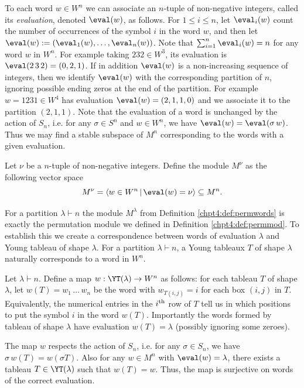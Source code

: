 \documentclass[11pt]{report}
\begin{document}
To each word $w \in W^n$ we can associate an $n$-tuple of non-negative 
integers, called its \emph{evaluation}, denoted $\eval(w)$, as follows. For $1\leq i 
\leq n$, let $\eval_i(w)$ count the number of occurrences of the symbol $i$ 
in the word $w$, and then let $\eval(w):= (\eval_1(w),\ldots,\eval_n(w))$.
Note that $\sum_{i=1}^n \eval_i(w) = n$ for any word $w$ in $W^n$.
For example taking $232 \in W^{3}$, its evaluation is 
$\eval(2\,3\,2) = (0,2,1)$. If in addition $\eval(w)$ is a 
non-increasing sequence of integers, then we identify $\eval(w)$ with the 
corresponding partition of $n$, ignoring possible ending zeros at the end 
of the partition. For example $ w = 1231 \in W^{4}$ has 
evaluation $\eval(w) = (2,1,1,0)$ and we associate it to the partition $(2,1,1)$.
Note that the evaluation of a word is unchanged by the action of $S_{n}$, 
i.e. for any $\sigma \in S^{n}$ and $w \in W^{n}$, we have  $\eval(w) 
= \eval(\sigma \, w)$. Thus we may find a stable subspace of $M^{n}$ 
corresponding to the words with a given evaluation.

\begin{defn}
	\label{chpt4:def:permwords}
	Let $\nu$ be a $n$-tuple of non-negative integers. Define the module 
	$M^{\nu}$ as the following vector space
	\[M^{\nu} = \langle w \in W^{n} \, | \, \eval(w) = \nu \rangle \subseteq M^{n}.\]
\end{defn}

For a partition $\lambda \vdash n$ the module $M^{\lambda}$ from Definition 
\ref{chpt4:def:permwords} is exactly the permutation module we defined in 
Definition \ref{chpt4:def:permmod}. To establish this we create a 
correspondence between words of evaluation $\lambda$ and Young tableau of shape $\lambda$. For a partition $\lambda\vdash n$, a Young tableaux $T$ of shape $\lambda$ naturally corresponds to a word in $W^n$. 
\begin{defn}
	Let $\lambda \vdash n$. Define a map $w:\YT(\lambda) \rightarrow W^{n}$ as follows: for each tableau $T$ of shape $\lambda$, let $w(T) = w_{1} \,\ldots \, w_{n}$ be the word with $w_{T(i,j)} = i$ for each box $(i,j)$ in $T$.	Equivalently, the numerical entries in the $i^{\rm th}$ row of $T$ tell us in which positions to put the symbol $i$ in the word $w(T)$. Importantly the words formed by tableau of shape $\lambda$ have evaluation $w(T) = \lambda$ (possibly ignoring some zeroes).
\end{defn}

The map $w$ respects the action of $S_{n}$, i.e. for any $\sigma \in S_{n}$, we have $\sigma \, w(T) = w( \sigma T)$. Also for any $w \in M^{n}$ with $\eval(w)=\lambda$, there exists a tableau $T\in\YT(\lambda)$ such that $w(T) =w$. Thus, the map is surjective on words of the correct evaluation. 
\end{document}
